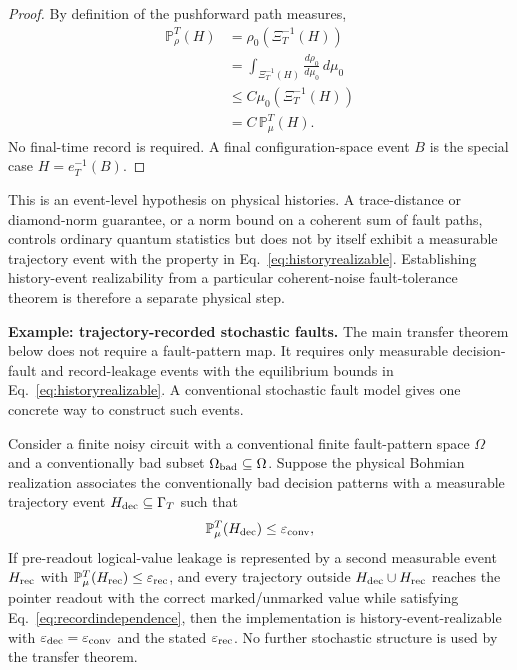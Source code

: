 \documentclass[pdflatex,sn-mathphys-num]{sn-jnl}
\theoremstyle{thmstyleone}
\begin{document}
\begin{proof}
By definition of the pushforward path measures,
\begin{align}
\mathbb P_\rho^T(H)
&=\rho_0(\Xi_T^{-1}(H))\\
&=\int_{\Xi_T^{-1}(H)}\frac{d\rho_0}{d\mu_0}\,d\mu_0\\
&\le C\mu_0(\Xi_T^{-1}(H))\\
&=C\,\mathbb P_\mu^T(H).
\end{align}
No final-time record is required. A final configuration-space event $B$ is the special case $H=e_T^{-1}(B)$.
\end{proof}

This is an event-level hypothesis on physical histories. A trace-distance or diamond-norm guarantee, or a norm bound on a coherent sum of fault paths, controls ordinary quantum statistics but does not by itself exhibit a measurable trajectory event with the property in Eq.~\eqref{eq:historyrealizable}. Establishing history-event realizability from a particular coherent-noise fault-tolerance theorem is therefore a separate physical step.

\medskip
\noindent\textbf{Example: trajectory-recorded stochastic faults.}
The main transfer theorem below does not require a fault-pattern map. It requires only measurable decision-fault and record-leakage events with the equilibrium bounds in Eq.~\eqref{eq:historyrealizable}. A conventional stochastic fault model gives one concrete way to construct such events.

Consider a finite noisy circuit with a conventional finite fault-pattern space $\Omega$ and a conventionally bad subset $\Omega_{\rm bad}\subseteq\Omega$. Suppose the physical Bohmian realization associates the conventionally bad decision patterns with a measurable trajectory event $H_{\rm dec}\subseteq\Gamma_T$ such that
\begin{equation}
\mathbb P_\mu^T(H_{\rm dec})\le \varepsilon_{\rm conv},
\label{eq:stochasticbadset}
\end{equation}
If pre-readout logical-value leakage is represented by a second measurable event $H_{\rm rec}$ with $\mathbb P_\mu^T(H_{\rm rec})\le\varepsilon_{\rm rec}$, and every trajectory outside $H_{\rm dec}\cup H_{\rm rec}$ reaches the pointer readout with the correct marked/unmarked value while satisfying Eq.~\eqref{eq:recordindependence}, then the implementation is history-event-realizable with $\varepsilon_{\rm dec}=\varepsilon_{\rm conv}$ and the stated $\varepsilon_{\rm rec}$. No further stochastic structure is used by the transfer theorem.
\end{document}
